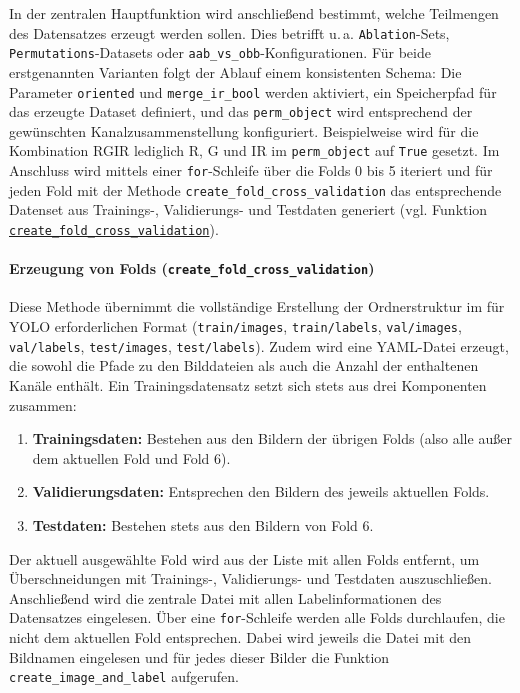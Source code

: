In der zentralen Hauptfunktion wird anschließend bestimmt, welche Teilmengen des Datensatzes erzeugt werden sollen. Dies betrifft u.\,a. \texttt{Ablation}-Sets, \texttt{Permutations}-Datasets oder \texttt{aab\_vs\_obb}-Konfigurationen. Für beide erstgenannten Varianten folgt der Ablauf einem konsistenten Schema: Die Parameter \lstinline|oriented| und \lstinline|merge_ir_bool| werden aktiviert, ein Speicherpfad für das erzeugte Dataset definiert, und das \lstinline|perm_object| wird entsprechend der gewünschten Kanalzusammenstellung konfiguriert. Beispielweise wird für die Kombination \acrshort{RGIR} lediglich \acrshort{R}, \acrshort{G} und \acrshort{IR} im \lstinline|perm_object| auf \lstinline|True| gesetzt. Im Anschluss wird mittels einer \texttt{for}-Schleife über die Folds 0 bis 5 iteriert und für jeden Fold mit der Methode \lstinline|create_fold_cross_validation| das entsprechende Datenset aus Trainings-, Validierungs- und Testdaten generiert (vgl. Funktion \hyperlink{par:create_fold_cv}{\lstinline|create_fold_cross_validation|}).

\paragraph{Erzeugung von Folds (\lstinline|create_fold_cross_validation|)}
\hypertarget{par:create_fold_cv}{}

Diese Methode übernimmt die vollständige Erstellung der Ordnerstruktur im für \acrshort{YOLO} erforderlichen Format (\texttt{train/images}, \texttt{train/labels}, \texttt{val/images}, \texttt{val/labels}, \texttt{test/images}, \texttt{test/labels}). Zudem wird eine \acrshort{YAML}-Datei erzeugt, die sowohl die Pfade zu den Bilddateien als auch die Anzahl der enthaltenen Kanäle enthält. Ein Trainingsdatensatz setzt sich stets aus drei Komponenten zusammen: 
\begin{enumerate}
    \item \textbf{Trainingsdaten:} Bestehen aus den Bildern der übrigen Folds (also alle außer dem aktuellen Fold und Fold 6).
    \item \textbf{Validierungsdaten:} Entsprechen den Bildern des jeweils aktuellen Folds.
    \item \textbf{Testdaten:} Bestehen stets aus den Bildern von Fold 6.
\end{enumerate}

Der aktuell ausgewählte Fold wird aus der Liste mit allen Folds entfernt, um Überschneidungen mit Trainings-, Validierungs- und Testdaten auszuschließen. Anschließend wird die zentrale Datei mit allen Labelinformationen des Datensatzes eingelesen. Über eine \texttt{for}-Schleife werden alle Folds durchlaufen, die nicht dem aktuellen Fold entsprechen. Dabei wird jeweils die Datei mit den Bildnamen eingelesen und für jedes dieser Bilder die Funktion \lstinline|create_image_and_label| aufgerufen.

